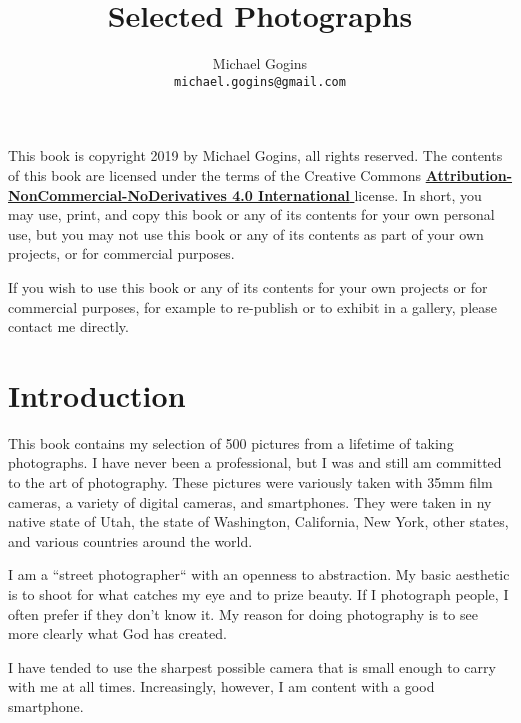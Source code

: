 \documentclass[11pt,chapterprefix=true,pagesize=letter]{scrbook}
\begin{document}
\frontmatter
\title{Selected Photographs}
\author{Michael Gogins \\ \texttt{michael.gogins@gmail.com}}
\dedication{This book is for Mick.}
\newpage
\noindent This book is copyright 2019 by Michael Gogins, all rights reserved. The contents of this book are licensed under the terms of the Creative Commons \href{https://creativecommons.org/licenses/by-nc-nd/4.0/legalcode}{\textbf{Attribution-NonCommercial-NoDerivatives 4.0 International} } license. In short, you may use, print, and copy this book or any of its contents for your own personal use, but you may not use this book or any of its contents as part of your own projects, or for commercial purposes.

If you wish to use this book or any of its contents for your own projects or for commercial purposes, for example to re-publish or to exhibit in a gallery, please contact me directly.
\maketitle

\tableofcontents
\listoffigures

\mainmatter
{}

\chapter{Introduction}

This book contains my selection of 500 pictures from a lifetime of taking photographs. I have never been a professional, but I was and still am committed to the art of photography. These pictures were variously taken with 35mm film cameras, a variety of digital cameras, and smartphones. They were taken in ny native state of Utah, the state of Washington, California, New York, other states, and various countries around the world. 

I am a ``street photographer`` with an openness to abstraction. My basic aesthetic is to shoot for what catches my eye and to prize beauty. If I photograph people, I often prefer if they don't know it. My reason for doing photography is to see more clearly what God has created.

I have tended to use the sharpest possible camera that is small enough to carry with me at all times. Increasingly, however, I am content with a good smartphone.
\end{document}
